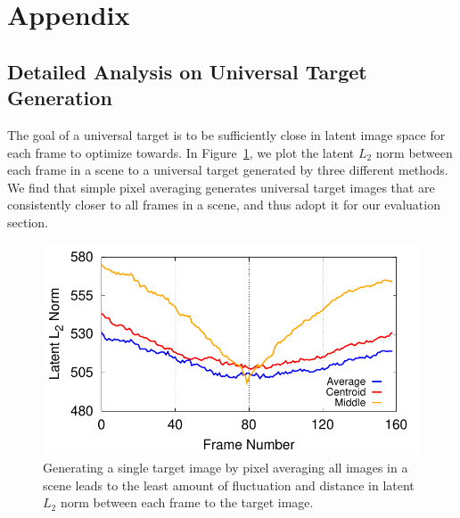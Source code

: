 \section{Appendix}
\label{sec:appendix}

\subsection{Detailed Analysis on Universal Target Generation}
\label{app:detailed-universal-target}
The goal of a universal target is to be sufficiently close in latent image space for each frame to optimize towards. In Figure~\ref{fig:target-selection-algorithm-results}, we plot the latent $L_2$ norm between each frame in a scene to a universal target generated by three different methods. We find that simple pixel averaging generates universal target images that are consistently closer to all frames in a scene, and thus adopt it for our evaluation section.

\begin{figure}[h]
    \centering
    \includegraphics[width=0.8\columnwidth]{plots/eval/scene-targets-eps-converted-to.pdf}
    \vspace{-0.15in}
    \caption{Generating a single target image by pixel averaging all images in a scene leads to the least amount of fluctuation and distance in latent $L_2$ norm between each frame to the target image.}
    \label{fig:target-selection-algorithm-results}
\end{figure}

